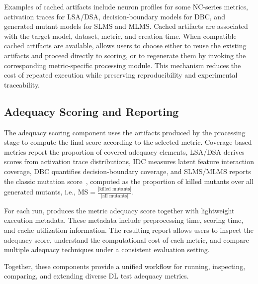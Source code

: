 Examples of cached artifacts include neuron profiles for some NC-series metrics, activation traces for LSA/DSA, decision-boundary models for DBC, and generated mutant models for SLMS and MLMS.
Cached artifacts are associated with the target model, dataset, metric, and creation time.
When compatible cached artifacts are available, \tool allows users to choose either to reuse the existing artifacts and proceed directly to scoring, or to regenerate them by invoking the corresponding metric-specific processing module.
This mechanism reduces the cost of repeated execution while preserving reproducibility and experimental traceability.

\subsection{Adequacy Scoring and Reporting}
The adequacy scoring component uses the artifacts produced by the processing stage to compute the final score according to the selected metric.
Coverage-based metrics report the proportion of covered adequacy elements, LSA/DSA derives scores from activation trace distributions, IDC measures latent feature interaction coverage, DBC quantifies decision-boundary coverage, and SLMS/MLMS reports the classic mutation score~\cite{bib:hu2019deepmutation++}, computed as the proportion of killed mutants over all generated mutants, i.e., $\text{MS} = \frac{|\text{killed mutants}|}{|\text{all mutants}|}$. 

For each run, \tool produces the metric adequacy score together with lightweight execution metadata.
These metadata include preprocessing time, scoring time, and cache utilization information.
The resulting report allows users to inspect the adequacy score, understand the computational cost of each metric, and compare multiple adequacy techniques under a consistent evaluation setting.

Together, these components provide a unified workflow for running, inspecting, comparing, and extending diverse DL test adequacy metrics.